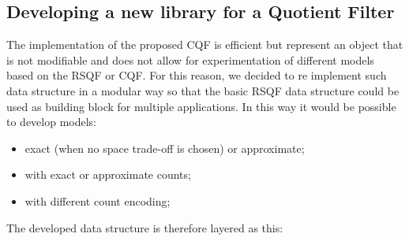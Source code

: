 \subsection{Developing a new library for a Quotient Filter}
The implementation of the proposed CQF is efficient but represent an object that is not modifiable and does not allow for experimentation of different models based on the RSQF or CQF.
For this reason, we decided to re implement such data structure in a modular way so that the basic RSQF data structure could be used as building block for multiple applications. In this way it would be possible to develop models:
\begin{itemize}
	\item exact (when no space trade-off is chosen) or approximate;
	\item with exact or approximate counts;
	\item with different count encoding;
\end{itemize}
The developed data structure is therefore layered as this:
